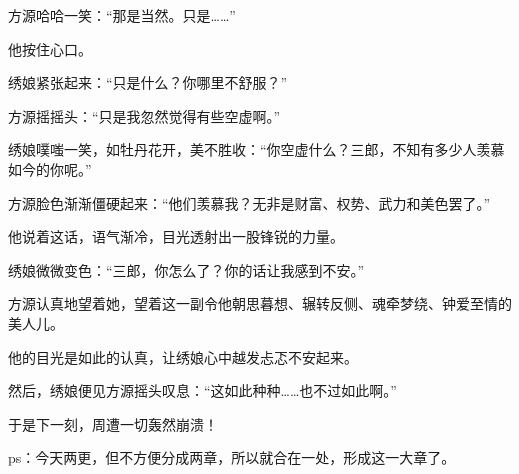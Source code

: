 \begin{this_body}
方源哈哈一笑：“那是当然。只是……”

他按住心口。

绣娘紧张起来：“只是什么？你哪里不舒服？”

方源摇摇头：“只是我忽然觉得有些空虚啊。”

绣娘噗嗤一笑，如牡丹花开，美不胜收：“你空虚什么？三郎，不知有多少人羡慕如今的你呢。”

方源脸色渐渐僵硬起来：“他们羡慕我？无非是财富、权势、武力和美色罢了。”

他说着这话，语气渐冷，目光透射出一股锋锐的力量。

绣娘微微变色：“三郎，你怎么了？你的话让我感到不安。”

方源认真地望着她，望着这一副令他朝思暮想、辗转反侧、魂牵梦绕、钟爱至情的美人儿。

他的目光是如此的认真，让绣娘心中越发忐忑不安起来。

然后，绣娘便见方源摇头叹息：“这如此种种……也不过如此啊。”

于是下一刻，周遭一切轰然崩溃！

ps：今天两更，但不方便分成两章，所以就合在一处，形成这一大章了。

\end{this_body}

